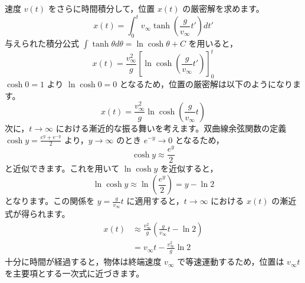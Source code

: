 \begin{solutionparts}
速度 $v(t)$ をさらに時間積分して，位置 $x(t)$ の厳密解を求めます。
\begin{equation*}
x(t) = \int_{0}^{t} v_{\infty} \tanh \left( \frac{g}{v_{\infty}} t' \right) dt'
\end{equation*}
与えられた積分公式 $\int \tanh \theta d\theta = \ln \cosh \theta + C$ を用いると，
\begin{equation*}
x(t) = \frac{v_{\infty}^2}{g} \left[ \ln \cosh \left( \frac{g}{v_{\infty}} t' \right) \right]_{0}^{t}
\end{equation*}
$\cosh 0 = 1$ より $\ln \cosh 0 = 0$ となるため，位置の厳密解は以下のようになります。
\begin{equation*}
x(t) = \frac{v_{\infty}^2}{g} \ln \cosh \left( \frac{g}{v_{\infty}} t \right)
\end{equation*}
次に，$t \to \infty$ における漸近的な振る舞いを考えます。双曲線余弦関数の定義 $\cosh y = \frac{e^y + e^{-y}}{2}$ より，$y \to \infty$ のとき $e^{-y} \to 0$ となるため，
\begin{equation*}
\cosh y \approx \frac{e^y}{2}
\end{equation*}
と近似できます。これを用いて $\ln \cosh y$ を近似すると，
\begin{equation*}
\ln \cosh y \approx \ln \left( \frac{e^y}{2} \right) = y - \ln 2
\end{equation*}
となります。この関係を $y = \frac{g}{v_{\infty}} t$ に適用すると，$t \to \infty$ における $x(t)$ の漸近式が得られます。
\begin{equation*}
\begin{aligned}
x(t) &\approx \frac{v_{\infty}^2}{g} \left( \frac{g}{v_{\infty}} t - \ln 2 \right) \\
&= v_{\infty} t - \frac{v_{\infty}^2}{g} \ln 2
\end{aligned}
\end{equation*}
十分に時間が経過すると，物体は終端速度 $v_{\infty}$ で等速運動するため，位置は $v_{\infty}t$ を主要項とする一次式に近づきます。

\end{solutionparts}
